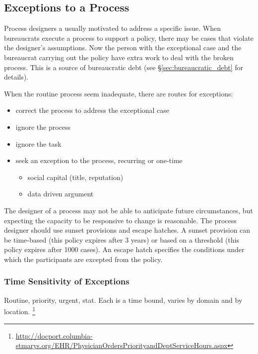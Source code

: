 \subsection{Exceptions to a Process\label{sec:exceptions-to-process}}


Process designers a usually motivated to address a specific issue. When bureaucrats execute a process to support a policy, there may be cases that violate the designer's assumptions. Now the person with the exceptional case and the bureaucrat carrying out the policy have extra work to deal with the broken process. This is a source of bureaucratic debt (see \S\ref{sec:bureaucratic_debt} for details). 

When the routine process seem inadequate, there are routes for exceptions:
\begin{itemize}
    \item correct the process to address the exceptional case
    \item ignore the process
    \item ignore the task
    \item seek an exception to the process, recurring or one-time
    \begin{itemize}
        \item social capital (title, reputation)
        \item data driven argument 
    \end{itemize}
\end{itemize}

The designer of a process may not be able to anticipate future circumstances, but expecting the capacity to be responsive to change is reasonable. The process designer should use sunset provisions and escape hatches.  
A sunset provision can be time-based (this policy expires after 3 years) or based on a threshold (this policy expires after 1000 cases). An escape hatch specifies the conditions under which the participants are excepted from the policy. 

\subsubsection{Time Sensitivity of Exceptions}
Routine, priority, urgent, stat. 
Each is a time bound, varies by domain and by location.
\footnote{\href{http://docport.columbia-stmarys.org/EHR/PhysicianOrdersPriorityandDeptServiceHours.aspx}{http://docport.columbia-stmarys.org/EHR/PhysicianOrdersPriorityandDeptServiceHours.aspx}}